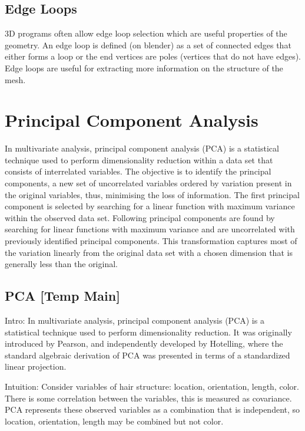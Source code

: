 \documentclass[ %
                    author={Dillon Keith Diep},
                supervisor={Dr. Carl Henrik Ek},
                    degree={MEng},
                     title={Assisted Content Generation for 3D Hair Geometry},
                  subtitle={[INCOMPLETE DRAFT, CONTAINS NOTES FROM RESEARCH]},
                      type={Research},
                      year={2014} ]{dissertation}
\begin{document}
\subsection{Edge Loops}
3D programs often allow edge loop selection which are useful properties of the geometry. An edge loop is defined (on blender) as a set of connected edges that either forms a loop or the end vertices are poles (vertices that do not have edges). Edge loops are useful for extracting more information on the structure of the mesh.
\cite{edgeloops}

\section{Principal Component Analysis}
In multivariate analysis, principal component analysis (PCA) is a statistical technique used to perform dimensionality reduction within a data set that consists of interrelated variables.
The objective is to identify the principal components, a new set of uncorrelated variables ordered by variation present in the original variables, thus, minimising the loss of information.\cite{pca2002}
The first principal component is selected by searching for a linear function with maximum variance within the observed data set.
Following principal components are found by searching for linear functions with maximum variance and are uncorrelated with previously identified principal components.
This transformation captures most of the variation linearly from the original data set with a chosen dimension that is generally less than the original.

\subsection{PCA [Temp Main]}
Intro:
In multivariate analysis, principal component analysis (PCA) is a statistical technique used to perform dimensionality reduction.\cite{pca2002} It was originally introduced by Pearson\cite{pca1901}, and independently developed by Hotelling\cite{pca1933}, where the standard algebraic derivation of PCA was presented in terms of a standardized linear projection.

Intuition:
Consider variables of hair structure: location, orientation, length, color. There is some correlation between the variables, this is measured as covariance. PCA represents these observed variables as a combination that is independent, so location, orientation, length may be combined but not color.
\end{document}
